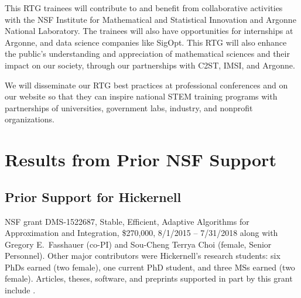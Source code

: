 \documentclass[11pt]{NSFamsart}
\begin{document}
This RTG trainees will contribute to and benefit from collaborative activities with the NSF Institute for Mathematical and Statistical Innovation  and Argonne National Laboratory. The trainees will also have opportunities for internships at Argonne, and data science companies like SigOpt. This RTG will also enhance the public’s understanding and appreciation of mathematical sciences and their impact on our society, through our partnerships with C2ST, IMSI, and Argonne. 
 
We will disseminate our RTG best practices at professional conferences and on our website so that they can inspire national STEM  training programs with partnerships of universities, government labs, industry, and nonprofit organizations.

 
\section{Results from Prior NSF Support}
 
\subsection*{Prior Support for Hickernell} NSF grant DMS-1522687, Stable, Efficient, Adaptive Algorithms for Approximation and Integration,
		\$270,000, 8/1/2015 -- 7/31/2018 along with Gregory E.\ Fasshauer (co-PI) and  Sou-Cheng Terrya Choi (female, Senior Personnel).  Other major contributors were Hickernell's research students: 
		six PhDs earned (two female), one current PhD student, and three MSs earned (two female).
Articles, theses, software, and preprints supported in
part by this grant include
\cite{ala_augmented_2017, ChoEtal17a, ChoEtal20a, Din15a, DinHic20a, GilEtal16a, Hic17a, HicJag18b, HicJim16a, HicEtal18a, HicEtal17a, HicKriWoz19a, RatHic19a, GilJim16b, JimHic16a, JohFasHic18a, Li16a, Liu17a, MarEtal18a, mccourt_stable_2017, MCCEtal19a, mishra_hybrid_2018, MisEtal19a, rashidinia_stable_2016, rashidinia_stable_2018, Zha18a, Zha17a, Zho15a, ZhoHic15a}.
\end{document}

